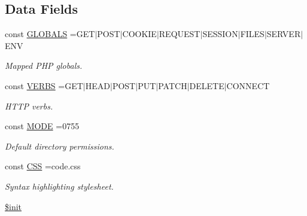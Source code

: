 \subsection*{Data Fields}
\begin{DoxyCompactItemize}
\item 
\hypertarget{class_base_a4a494a8977b10f1b9980faadf3ea0fc2}{}\label{class_base_a4a494a8977b10f1b9980faadf3ea0fc2} 
const \hyperlink{class_base_a4a494a8977b10f1b9980faadf3ea0fc2}{G\+L\+O\+B\+A\+LS} =\textquotesingle{}G\+ET$\vert$P\+O\+ST$\vert$C\+O\+O\+K\+IE$\vert$R\+E\+Q\+U\+E\+ST$\vert$S\+E\+S\+S\+I\+ON$\vert$F\+I\+L\+ES$\vert$S\+E\+R\+V\+ER$\vert$E\+NV\textquotesingle{}
\begin{DoxyCompactList}\small\item\em Mapped P\+HP globals. \end{DoxyCompactList}\item 
\hypertarget{class_base_a43552934268bce7080a8a0dfdab5ff48}{}\label{class_base_a43552934268bce7080a8a0dfdab5ff48} 
const \hyperlink{class_base_a43552934268bce7080a8a0dfdab5ff48}{V\+E\+R\+BS} =\textquotesingle{}G\+ET$\vert$H\+E\+AD$\vert$P\+O\+ST$\vert$P\+UT$\vert$P\+A\+T\+CH$\vert$D\+E\+L\+E\+TE$\vert$C\+O\+N\+N\+E\+CT\textquotesingle{}
\begin{DoxyCompactList}\small\item\em H\+T\+TP verbs. \end{DoxyCompactList}\item 
\hypertarget{class_base_a4eea605dd8e0b6a69464ec041dc9872a}{}\label{class_base_a4eea605dd8e0b6a69464ec041dc9872a} 
const \hyperlink{class_base_a4eea605dd8e0b6a69464ec041dc9872a}{M\+O\+DE} =0755
\begin{DoxyCompactList}\small\item\em Default directory permissions. \end{DoxyCompactList}\item 
\hypertarget{class_base_ad3c2e05f38fee8ac8cdc370fd4c84941}{}\label{class_base_ad3c2e05f38fee8ac8cdc370fd4c84941} 
const \hyperlink{class_base_ad3c2e05f38fee8ac8cdc370fd4c84941}{C\+SS} =\textquotesingle{}code.\+css\textquotesingle{}
\begin{DoxyCompactList}\small\item\em Syntax highlighting stylesheet. \end{DoxyCompactList}\item 
\hypertarget{class_base_a8834b0851b05d161c207a7d2e5dca9bd}{}\label{class_base_a8834b0851b05d161c207a7d2e5dca9bd} 
\hyperlink{class_base_a8834b0851b05d161c207a7d2e5dca9bd}{\$init}

\end{DoxyCompactItemize}
